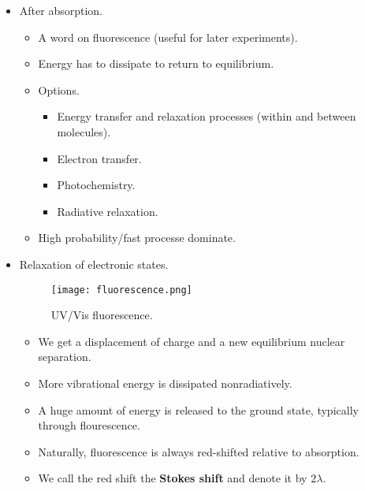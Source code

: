 \documentclass[../notes.tex]{subfiles}
\begin{document}
\begin{itemize}
\begin{itemize}
    \end{itemize}
    \item After absorption.
    \begin{itemize}
        \item A word on fluorescence (useful for later experiments).
        \item Energy has to dissipate to return to equilibrium.
        \item Options.
        \begin{itemize}
            \item Energy transfer and relaxation processes (within and between molecules).
            \item Electron transfer.
            \item Photochemistry.
            \item Radiative relaxation.
        \end{itemize}
        \item High probability/fast processe dominate.
    \end{itemize}
    \item Relaxation of electronic states.
    \begin{figure}[h!]
        \centering
        \texttt{[image: fluorescence.png]}
        \caption{UV/Vis fluorescence.}
        \label{fig:fluorescence}
    \end{figure}
    \begin{itemize}
        \item We get a displacement of charge and a new equilibrium nuclear separation.
        \item More vibrational energy is dissipated nonradiatively.
        \item A huge amount of energy is released to the ground state, typically through flourescence.
        \item Naturally, fluorescence is always red-shifted relative to absorption.
        \item We call the red shift the \textbf{Stokes shift} and denote it by $2\lambda$.
    \end{itemize}
\end{itemize}
\end{document}
